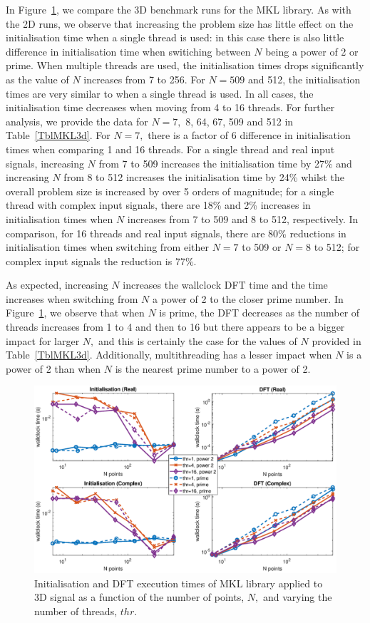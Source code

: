 \documentclass[a4paper]{article}
\begin{document}
In Figure~\ref{3DMKL}, we compare the 3D benchmark runs for the MKL
library. As with the 2D runs, we observe that increasing the problem
size has little effect on the initialisation time when a single thread
is used: in this case there is also little difference in
initialisation time when switiching between $N$ being a power of 2 or
prime. When multiple threads are used, the initialisation times drops
significantly as the value of $N$ increases from 7 to 256. For $N=509$
and 512, the initialisation times are very similar to when a single
thread is used. In all cases, the initialisation time decreases when
moving from 4 to 16 threads. For further analysis, we provide the data
for $N=7,$ 8, 64, 67, 509 and 512 in Table~\ref{TblMKL3d}. For $N=7,$
there is a factor of 6 difference in initialisation times when
comparing 1 and 16 threads. For a single thread and real input
signals, increasing $N$ from 7 to 509 increases the initialisation
time by 27\% and increasing $N$ from 8 to 512 increases the
initialisation time by 24\% whilst the overall problem size is
increased by over 5 orders of magnitude; for a single thread with
complex input signals, there are 18\% and 2\% increases in
initialisation times when $N$ increases from 7 to 509 and 8 to 512,
respectively. In comparison, for 16 threads and real input signals,
there are 80\% reductions in initialisation times when switching from
either $N=7$ to 509 or $N=8$ to 512; for complex input signals the
reduction is 77\%.

As expected, increasing $N$ increases the wallclock DFT time and the
time increases when switching from $N$ a power of 2 to the closer
prime number. In Figure~\ref{3DMKL}, we observe that when $N$ is
prime, the DFT decreases as the number of threads increases from 1 to
4 and then to 16 but there appears to be a bigger impact for larger
$N,$ and this is certainly the case for the values of $N$ provided in
Table~\ref{TblMKL3d}. Additionally, multithreading has a lesser
impact when $N$ is a power of 2 than when $N$ is the nearest prime
number to a power of 2.

\begin{figure}[htb]
    \centering
    \includegraphics[width=0.9\linewidth]{../results/mkl_3d_thr.eps}
  \caption{Initialisation and DFT execution times of MKL library applied to 3D signal as a function of the
    number of points, $N,$ and varying the number of threads, $thr.$ }
  \label{3DMKL}
\end{figure}
\end{document}
